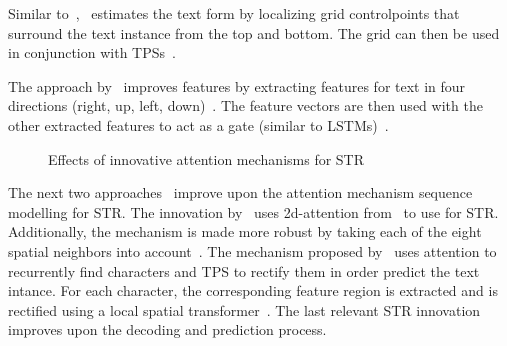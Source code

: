 Similar to~\cite{zhan_esir_2019},~\cite{shi_aster_2019} estimates the text form by localizing
grid controlpoints that surround the text instance from the top and bottom.
The grid can then be used in conjunction with \acp{TPS}~\citep{shi_aster_2019}.

The approach by~\cite{cheng_aon_2018} improves features by extracting features for text in
four directions (right, up, left, down)~\citep{cheng_aon_2018}.
The feature vectors are then used with the other extracted features to act as a gate (similar to
\acp{LSTM})~\citep{cheng_aon_2018}.

\begin{figure}[ht]
    \centering\scriptsize
    \caption{%
        Effects of innovative attention mechanisms for STR\label{fig:attention-examples}
    }
\end{figure}
The next two approaches~\citep{li_show_2019,liu_char-net_2018} improve upon the attention mechanism
sequence modelling for \ac{STR}.
The innovation by~\cite{li_show_2019} uses 2d-attention from~\citep{xu_show_2016} to use
for \ac{STR}.
Additionally, the mechanism is made more robust by taking each of the eight spatial neighbors into
account~\citep{li_show_2019}.
The mechanism proposed by~\cite{liu_char-net_2018} uses attention to recurrently find characters and
\ac{TPS} to rectify them in order predict the text intance.
For each character, the corresponding feature region is extracted and is
rectified using a local spatial transformer~\citep{liu_char-net_2018}.
The last relevant \ac{STR} innovation improves upon the decoding and prediction process.

